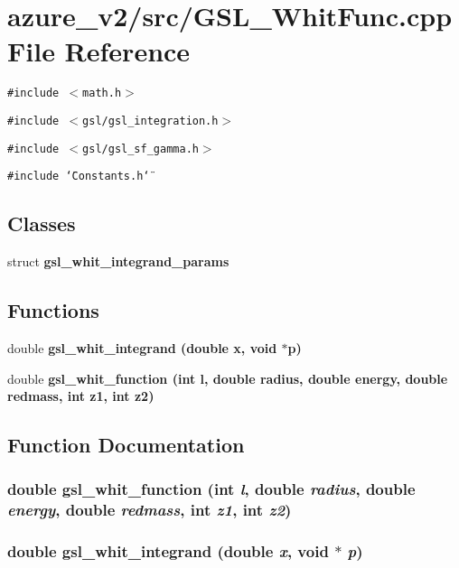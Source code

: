 \section{azure\_\-v2/src/GSL\_\-Whit\-Func.cpp File Reference}
\label{GSL__WhitFunc_8cpp}
{\tt \#include $<$math.h$>$}\par
{\tt \#include $<$gsl/gsl\_\-integration.h$>$}\par
{\tt \#include $<$gsl/gsl\_\-sf\_\-gamma.h$>$}\par
{\tt \#include \char`\"{}Constants.h\char`\"{}}\par
\subsection*{Classes}
\begin{CompactItemize}
\item 
struct \bf{gsl\_\-whit\_\-integrand\_\-params}
\end{CompactItemize}
\subsection*{Functions}
\begin{CompactItemize}
\item 
double \bf{gsl\_\-whit\_\-integrand} (double x, void $\ast$p)
\item 
double \bf{gsl\_\-whit\_\-function} (int l, double radius, double energy, double redmass, int z1, int z2)
\end{CompactItemize}


\subsection{Function Documentation}
\subsubsection{\setlength{\rightskip}{0pt plus 5cm}double gsl\_\-whit\_\-function (int {\em l}, double {\em radius}, double {\em energy}, double {\em redmass}, int {\em z1}, int {\em z2})}\label{GSL__WhitFunc_8cpp_1a3a200605d453f2ccdfe9bd59fbaa96}


\subsubsection{\setlength{\rightskip}{0pt plus 5cm}double gsl\_\-whit\_\-integrand (double {\em x}, void $\ast$ {\em p})}\label{GSL__WhitFunc_8cpp_3fa5c7e1c6774a7cd8bdb526488e54ef}


